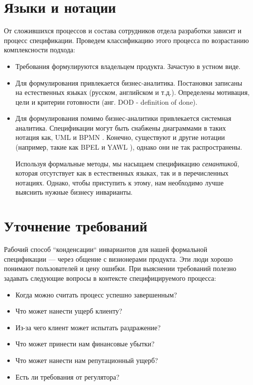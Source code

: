 \documentclass[14pt, openany]{report}
\begin{document}
\section{Языки и нотации}
От сложившихся процессов и состава сотрудников отдела разработки зависит и процесс спецификации. Проведем классификацию этого процесса по возрастанию комплексности подхода:
\begin{itemize}
  \item Требования формулируются владельцем продукта. Зачастую в устном виде.
  \item Для формулирования привлекается бизнес-аналитика. Постановки записаны на естественных языках (русском, английском и т.д.). Определены мотивация, цели и критерии готовности (анг. DOD - definition of done).
  \item Для формулирования помимо бизнес-аналитики привлекается системная аналитика. Спецификации могут быть снабжены диаграммами в таких нотация как, UML \cite{uml} и BPMN \cite{uml}. Конечно, существуют и другие нотации (например, такие как BPEL \cite{bpel} и YAWL \cite{yawl}), однако они не так распространены.

Используя формальные методы, мы насыщаем спецификацию \emph{семантикой}, которая отсутствует как в естественных языках, так и в перечисленных нотациях. Однако, чтобы приступить к этому, нам необходимо лучше выяснить нужные бизнесу инварианты.

\end{itemize}

\section{Уточнение требований}
Рабочий способ ``конденсации`` инвариантов для нашей формальной спецификации --- через общение с визионерами продукта. Эти люди хорошо понимают пользователей и цену ошибки. При выяснении требований полезно задавать следующие вопросы в контексте специфицируемого процесса:
\begin{itemize}
  \item Когда можно считать процесс успешно завершенным?
  \item Что может нанести ущерб клиенту?
  \item Из-за чего клиент может испытать раздражение?
  \item Что может принести нам финансовые убытки?
  \item Что может нанести нам репутационный ущерб?
  \item Есть ли требования от регулятора?
\end{itemize}
\end{document}
